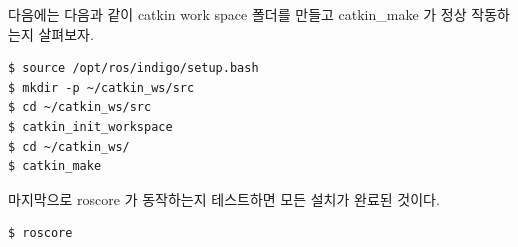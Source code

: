 다음에는 다음과 같이 catkin work space 폴더를 만들고 catkin\_make 가 정상 작동하는지 살펴보자.

\begin{lstlisting}[language=ROS]
$ source /opt/ros/indigo/setup.bash
$ mkdir -p ~/catkin_ws/src
$ cd ~/catkin_ws/src
$ catkin_init_workspace
$ cd ~/catkin_ws/
$ catkin_make
\end{lstlisting}

마지막으로 roscore 가 동작하는지 테스트하면 모든 설치가 완료된 것이다.

\begin{lstlisting}[language=ROS]
$ roscore
\end{lstlisting}



































































